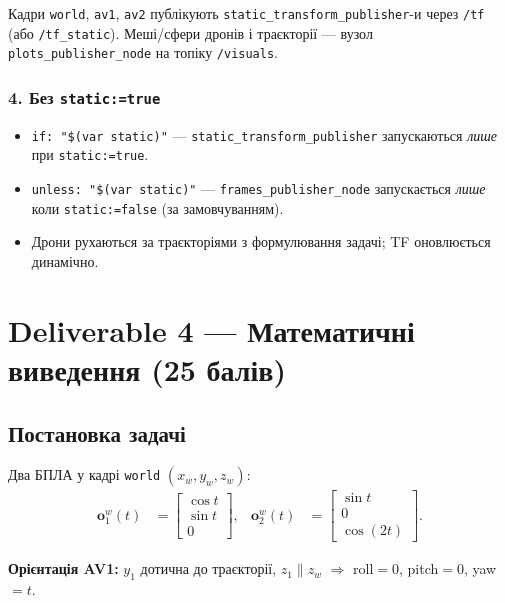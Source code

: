 \documentclass[11pt,a4paper]{article}
\begin{document}
Кадри \texttt{world}, \texttt{av1}, \texttt{av2} публікують \texttt{static\_transform\_publisher}-и через \texttt{/tf} (або \texttt{/tf\_static}).
Меші/сфери дронів і траєкторії --- вузол \texttt{plots\_publisher\_node} на топіку \texttt{/visuals}.

\subsubsection*{4. Без \texttt{static:=true}}

\begin{itemize}
  \item \texttt{if: "\$(var static)"} --- \texttt{static\_transform\_publisher} запускаються \emph{лише} при \texttt{static:=true}.
  \item \texttt{unless: "\$(var static)"} --- \texttt{frames\_publisher\_node} запускається \emph{лише} коли \texttt{static:=false} (за замовчуванням).
  \item Дрони рухаються за траєкторіями з формулювання задачі; TF оновлюється динамічно.
\end{itemize}

\section{Deliverable 4 --- Математичні виведення (25 балів)}

\subsection{Постановка задачі}

Два БПЛА у кадрі \texttt{world} $(x_w,y_w,z_w)$:
\begin{align}
  \bm{o}_1^w(t) &= \begin{bmatrix}\cos t \\ \sin t \\ 0\end{bmatrix}, &
  \bm{o}_2^w(t) &= \begin{bmatrix}\sin t \\ 0 \\ \cos(2t)\end{bmatrix}.
\end{align}

\textbf{Орієнтація AV1:} $y_1$ дотична до траєкторії, $z_1 \parallel z_w$ $\Rightarrow$ roll${}=0$, pitch${}=0$, yaw${}=t$.
\end{document}
